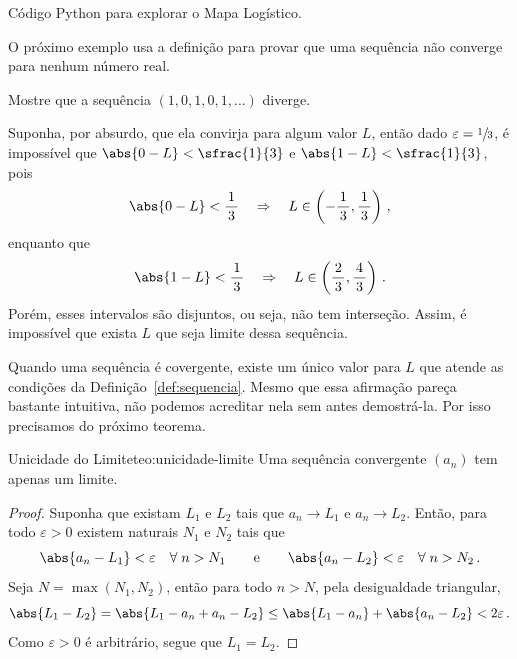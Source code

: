 {
  Código Python para explorar o Mapa Logístico.
}

O próximo exemplo usa a definição para provar que uma sequência não converge
para nenhum número real.

\begin{example}
    Mostre que a sequência $(1, 0, 1, 0, 1, \dots)$ diverge.

    \solution
    Suponha, por absurdo, que ela convirja para algum valor $L$,
    então dado $\varepsilon=\sfrac{1}{3}$, é impossível que $\abs{0-L}<\sfrac{1}{3}$ e $\abs{1-L}<\sfrac{1}{3}$, pois
    \[
      \abs{0-L}<\frac{1}{\,3\,}
      \quad \Rightarrow \quad
      L\in\left(-\frac{1}{\,3\,}, \frac{1}{\,3\,}\right) \,,
    \]
    enquanto que
    \[
      \abs{1-L}<\frac{1}{\,3\,}
      \quad \Rightarrow \quad
      L\in\left(\frac{2}{\,3\,}, \frac{4}{\,3\,}\right) \,.
    \]
    Porém, esses intervalos são disjuntos, ou seja, não tem interseção.
    Assim, é impossível que exista $L$ que seja limite dessa sequência.
\end{example}

Quando uma sequência é covergente, existe um único valor para $L$ que
atende as condições da Definição~\ref{def:sequencia}.
Mesmo que essa afirmação pareça bastante intuitiva, não podemos acreditar nela
sem antes demostrá-la. Por isso precisamos do próximo teorema.

\begin{teorema}{Unicidade do Limite}{teo:unicidade-limite}
    Uma sequência convergente $(a_n)$ tem apenas um limite.
\end{teorema}
\begin{proof}
    Suponha que existam $L_1$ e $L_2$ tais que $a_n\to L_1$ e $a_n\to L_2$.
    Então, para todo $\varepsilon>0$ existem naturais $N_1$ e $N_2$ tais que
    \[
      \abs{a_n-L_1}<\varepsilon \quad \forall \; n>N_1
      \qquad\text{e}\qquad
      \abs{a_n-L_2}<\varepsilon \quad \forall \; n>N_2 \,.
    \]
    Seja $N=\max(N_1, N_2)$, então para todo $n>N$, pela desigualdade triangular,
    \[
      \abs{L_1-L_2}
      =    \abs{L_1-a_n+a_n-L_2}
      \leq \abs{L_1-a_n} + \abs{a_n-L_2}
      <   2\varepsilon \,.
    \]
    Como $\varepsilon>0$ é arbitrário, segue que $L_1=L_2$.
\end{proof}

